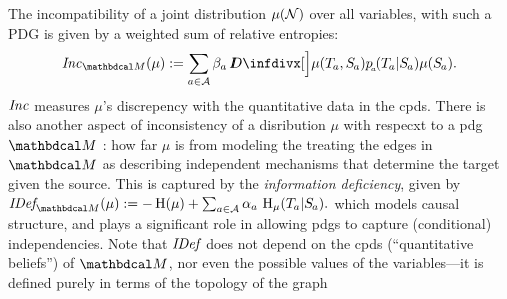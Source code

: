 \documentclass[twoside]{article}
\begin{document}
The incompatibility of a joint distribution $\mu(\mathcal N)$ over all variables, with such a PDG is given by a weighted sum of relative entropies:
\begin{align*}
    \Inc_{\dg M}(\mu) :=
        \sum_{a \in \Ar} \beta_a\, \kldiv[\Big]{\mu(\Tgt a,\Src a)}{p\ssub a(\Tgt a | \Src a) \mu(\Src a)}.
\end{align*}
$\mathit{Inc}$ measures $\mu$'s
discrepency 
with the quantitative data in the cpds. 
There is also another aspect of inconsistency of a disribution $\mu$
with respecxt to a pdg ${\dg M}$ : how far $\mu$ is from modeling the 
treating the edges in ${\dg M}$ as describing independent mechanisms
that determine the target given the source.  This is captured by the
\emph{information deficiency}, given by
$
    \IDef{\dg M}(\mu) := - \H(\mu) + \sum_{a \in \Ar} \alpha_a\,
        \H_\mu(\Tgt a | \Src a). 
$
        which
    models causal structure, and plays a significant role in allowing pdgs to capture (conditional) independencies.
Note that $\mathit{IDef}_{\!}$ does not depend on the cpds (``quantitative
beliefs'') of $\dg M$, nor even the possible values of the
variables---it is defined purely in terms of the topology of the graph
\end{document}
